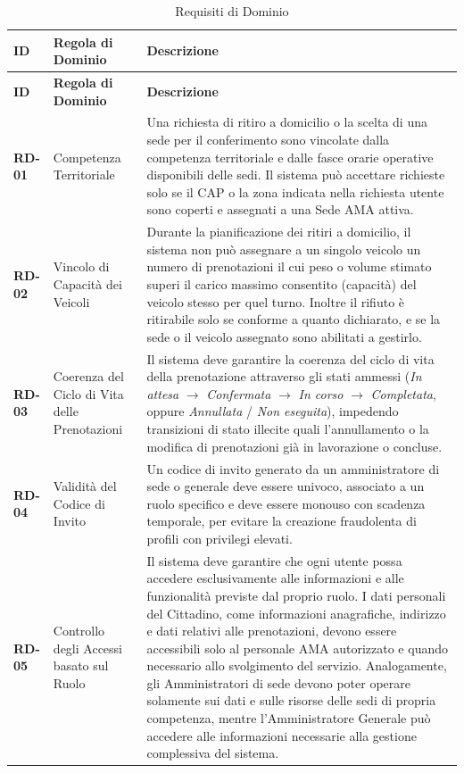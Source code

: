 \begin{center}
\renewcommand{\arraystretch}{1.3}
\begin{longtable}{|p{1.8cm}|p{3.2cm}|p{9.0cm}|}
\caption{Requisiti di Dominio}\label{tab:rd} \\ \hline
\rowcolor{tableheader} \textbf{ID} & \textbf{Regola di Dominio} & \textbf{Descrizione} \\ \hline
\endfirsthead

\hline
\rowcolor{tableheader} \textbf{ID} & \textbf{Regola di Dominio} & \textbf{Descrizione} \\ \hline
\endhead

\textbf{RD-01} & Competenza Territoriale & Una richiesta di ritiro a domicilio o la scelta di una sede per il conferimento sono vincolate dalla competenza territoriale e dalle fasce orarie operative disponibili delle sedi. Il sistema può accettare richieste solo se il CAP o la zona indicata nella richiesta utente sono coperti e assegnati a una Sede AMA attiva. \\ \hline

\textbf{RD-02} & Vincolo di Capacità dei Veicoli & Durante la pianificazione dei ritiri a domicilio, il sistema non può assegnare a un singolo veicolo un numero di prenotazioni il cui peso o volume stimato superi il carico massimo consentito (capacità) del veicolo stesso per quel turno. Inoltre il rifiuto è ritirabile solo se conforme a quanto dichiarato, e se la sede o il veicolo assegnato sono abilitati a gestirlo. \\ \hline

\textbf{RD-03} & Coerenza del Ciclo di Vita delle Prenotazioni & Il sistema deve garantire la coerenza del ciclo di vita della prenotazione attraverso gli stati ammessi (\textit{In attesa} $\rightarrow$ \textit{Confermata} $\rightarrow$ \textit{In corso} $\rightarrow$ \textit{Completata}, oppure \textit{Annullata} / \textit{Non eseguita}), impedendo transizioni di stato illecite quali l'annullamento o la modifica di prenotazioni già in lavorazione o concluse. \\ \hline

\textbf{RD-04} & Validità del Codice di Invito & Un codice di invito generato da un amministratore di sede o generale deve essere univoco, associato a un ruolo specifico e deve essere monouso con scadenza temporale, per evitare la creazione fraudolenta di profili con privilegi elevati. \\ \hline

\textbf{RD-05} & Controllo degli Accessi basato sul Ruolo & Il sistema deve garantire che ogni utente possa accedere esclusivamente alle informazioni e alle funzionalità previste dal proprio ruolo. I dati personali del Cittadino, come informazioni anagrafiche, indirizzo e dati relativi alle prenotazioni, devono essere accessibili solo al personale AMA autorizzato e quando necessario allo svolgimento del servizio. Analogamente, gli Amministratori di sede devono poter operare solamente sui dati e sulle risorse delle sedi di propria competenza, mentre l'Amministratore Generale può accedere alle informazioni necessarie alla gestione complessiva del sistema. \\ \hline


\end{longtable}
\end{center}
